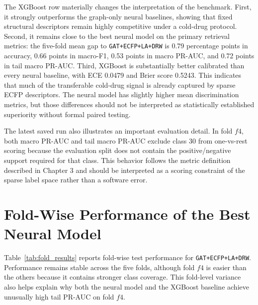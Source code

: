 The XGBoost row materially changes the interpretation of the benchmark. First, it strongly outperforms the graph-only neural baselines, showing that fixed structural descriptors remain highly competitive under a cold-drug protocol. Second, it remains close to the best neural model on the primary retrieval metrics: the five-fold mean gap to \texttt{GAT+ECFP+LA+DRW} is 0.79 percentage points in accuracy, 0.66 points in macro-F1, 0.53 points in macro PR-AUC, and 0.72 points in tail macro PR-AUC. Third, XGBoost is substantially better calibrated than every neural baseline, with ECE 0.0479 and Brier score 0.5243. This indicates that much of the transferable cold-drug signal is already captured by sparse ECFP descriptors. The neural model has slightly higher mean discrimination metrics, but those differences should not be interpreted as statistically established superiority without formal paired testing.

The latest saved run also illustrates an important evaluation detail. In fold \(f4\), both macro PR-AUC and tail macro PR-AUC exclude class 30 from one-vs-rest scoring because the evaluation split does not contain the positive/negative support required for that class. This behavior follows the metric definition described in Chapter 3 and should be interpreted as a scoring constraint of the sparse label space rather than a software error.

\section{Fold-Wise Performance of the Best Neural Model}
Table~\ref{tab:fold_results} reports fold-wise test performance for \texttt{GAT+ECFP+LA+DRW}. Performance remains stable across the five folds, although fold \(f4\) is easier than the others because it contains stronger class coverage. This fold-level variance also helps explain why both the neural model and the XGBoost baseline achieve unusually high tail PR-AUC on fold \(f4\).

\begin{table}[H]
\centering
\caption{Fold-wise test performance of GAT+ECFP+LA+DRW.}
\label{tab:fold_results}
\end{table}

